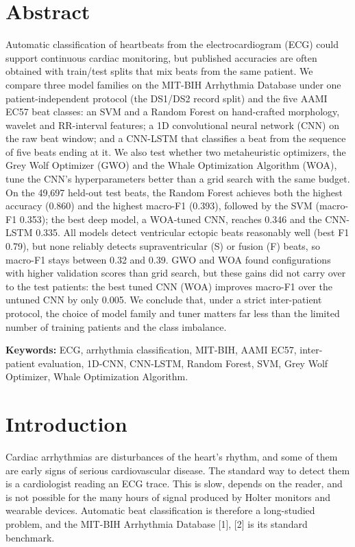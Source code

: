 \documentclass[11pt,a4paper]{article}
\begin{document}
\section*{Abstract}
Automatic classification of heartbeats from the electrocardiogram (ECG) could support continuous cardiac monitoring, but published accuracies are often obtained with train/test splits that mix beats from the same patient. We compare three model families on the MIT-BIH Arrhythmia Database under one patient-independent protocol (the DS1/DS2 record split) and the five AAMI EC57 beat classes: an SVM and a Random Forest on hand-crafted morphology, wavelet and RR-interval features; a 1D convolutional neural network (CNN) on the raw beat window; and a CNN-LSTM that classifies a beat from the sequence of five beats ending at it. We also test whether two metaheuristic optimizers, the Grey Wolf Optimizer (GWO) and the Whale Optimization Algorithm (WOA), tune the CNN's hyperparameters better than a grid search with the same budget. On the 49,697 held-out test beats, the Random Forest achieves both the highest accuracy (0.860) and the highest macro-F1 (0.393), followed by the SVM (macro-F1 0.353); the best deep model, a WOA-tuned CNN, reaches 0.346 and the CNN-LSTM 0.335. All models detect ventricular ectopic beats reasonably well (best F1 0.79), but none reliably detects supraventricular (S) or fusion (F) beats, so macro-F1 stays between 0.32 and 0.39. GWO and WOA found configurations with higher validation scores than grid search, but these gains did not carry over to the test patients: the best tuned CNN (WOA) improves macro-F1 over the untuned CNN by only 0.005. We conclude that, under a strict inter-patient protocol, the choice of model family and tuner matters far less than the limited number of training patients and the class imbalance.

\noindent\textbf{Keywords:} ECG, arrhythmia classification, MIT-BIH, AAMI EC57, inter-patient evaluation, 1D-CNN, CNN-LSTM, Random Forest, SVM, Grey Wolf Optimizer, Whale Optimization Algorithm.

\newpage
\tableofcontents
\newpage

\section{Introduction}
Cardiac arrhythmias are disturbances of the heart's rhythm, and some of them are early signs of serious cardiovascular disease. The standard way to detect them is a cardiologist reading an ECG trace. This is slow, depends on the reader, and is not possible for the many hours of signal produced by Holter monitors and wearable devices. Automatic beat classification is therefore a long-studied problem, and the MIT-BIH Arrhythmia Database [1], [2] is its standard benchmark.
\end{document}
